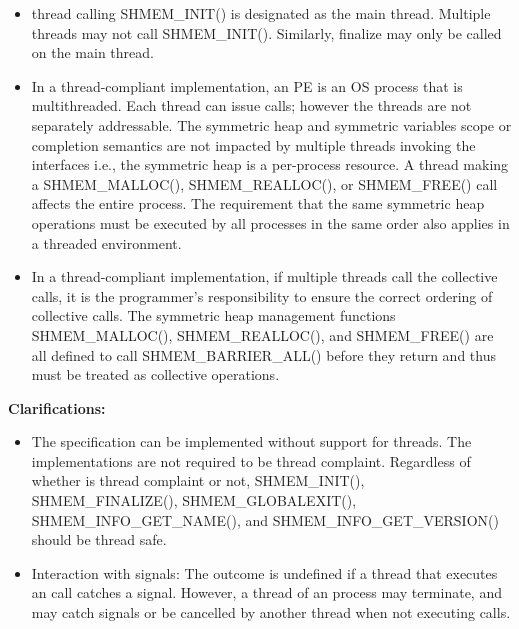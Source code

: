 \begin{itemize}

\item
\openshmem{} thread calling SHMEM\_INIT() is designated as the main thread.
Multiple threads may not call SHMEM\_INIT(). Similarly, \openshmem{} finalize
may only be called on the main thread.
 
\item
In a thread-compliant implementation, an \openshmem{} PE is an OS process that
is multithreaded. Each thread can issue \openshmem{} calls; however the threads
are not separately addressable. The symmetric heap and symmetric variables scope
or completion semantics are not impacted by multiple threads invoking the
\openshmem{} interfaces i.e., the symmetric heap is a per-process resource. A
thread making a SHMEM\_MALLOC(), SHMEM\_REALLOC(), or SHMEM\_FREE() call affects
the entire process. The requirement that the same symmetric heap operations must
be executed by all processes in the same order also applies in a threaded
environment.
 
\item
In a thread-compliant implementation, if multiple threads call the collective
calls, it is the programmer's responsibility to ensure the correct ordering of
collective calls.  The symmetric heap management functions SHMEM\_MALLOC(),
SHMEM\_REALLOC(), and SHMEM\_FREE() are all defined to call
SHMEM\_BARRIER\_ALL() before they return and thus must be treated as collective
operations.

\end{itemize} 
 
{\bf Clarifications:}
 
\begin{itemize}
\item[]
The \openshmem{} specification can be implemented without support for threads.
The \openshmem{} implementations are not required to be thread complaint.
Regardless of whether \openshmem{} is thread complaint or not, SHMEM\_INIT(),
SHMEM\_FINALIZE(), SHMEM\_GLOBALEXIT(), SHMEM\_INFO\_GET\_NAME(), and
SHMEM\_INFO\_GET\_VERSION() should be thread safe.
 
\item[]
Interaction with signals: The outcome is undefined if a thread that executes an
\openshmem{} call catches a signal. However, a thread of an \openshmem{} process
may terminate, and may catch signals or be cancelled by another thread when not
executing \openshmem{} calls.
\end{itemize}
